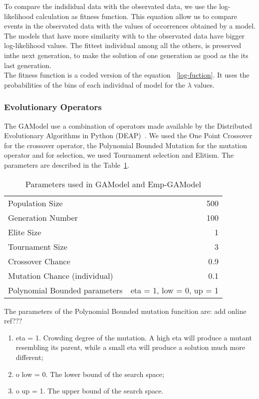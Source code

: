 To compare the indididual data with the observated data, we use the log-likelihood calculation as fitness function. This equation allow us to compare events in the observated data with the values of occorrences obtained by a model. The models that have more similarity with to the observated data have bigger log-likelihood values. The fittest individual among all the others, is preserved inthe next generation, to make the solution of one generation as good as the its last generation.\\

The fitness function is a coded version of the equation ~\ref{log-fuction}. It uses the probabilities of the bins of each individual of model for the $\lambda$ values.\\

\subsubsection{Evolutionary Operators}\label{gaOperators}
The GAModel use a combination of operators made available by the Distributed Evolutionary Algorithms in Python (DEAP)~\cite{DeRainville}. We used the One Point Crossover for the crossover operator, the Polynomial Bounded Mutation for the mutation operator and for selection, we used Tournament selection and Elitism. The parameters are described in the Table~\ref{GAParameters}.

\begin{table}[!ht]
  \caption{Parameters used in GAModel and Emp-GAModel}
  \label{GAParameters}
  \begin{center}
  \begin{tabular}{|l|r|}
    \hline
    Population Size & 500\\
    Generation Number & 100\\
    Elite Size & 1\\
    Tournament Size & 3\\
    Crossover Chance & 0.9\\
    Mutation Chance (individual) & 0.1\\
	Polynomial Bounded parameters & eta = 1, low = 0, up = 1\\
    \hline    
  \end{tabular}
  \end{center}
\end{table}

The parameters of the Polynomial Bounded mutation funcition are: add online ref???
\begin{enumerate}
\item eta = 1. Crowding degree of the mutation. A high eta will produce a mutant resembling its parent, while a small eta will produce a solution much more different;
\item o low = 0. The lower bound of the search space;
\item o up = 1. The upper bound of the search space.
\end{enumerate}

